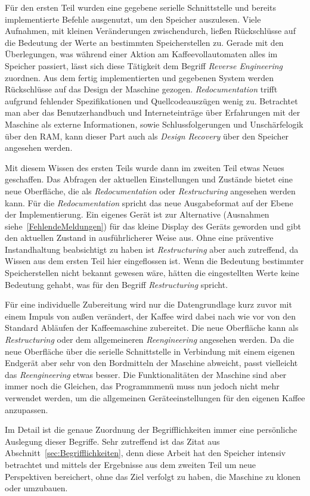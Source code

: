 Für den ersten Teil wurden eine gegebene serielle Schnittstelle und bereits implementierte Befehle ausgenutzt, um den Speicher auszulesen.
Viele Aufnahmen, mit kleinen Veränderungen zwischendurch, ließen Rückschlüsse auf die Bedeutung der Werte an bestimmten Speicherstellen zu.
Gerade mit den Überlegungen, was während einer Aktion am Kaffeevollautomaten alles im Speicher passiert, lässt sich diese Tätigkeit dem Begriff \textit{Reverse Engineering} zuordnen.
Aus dem fertig implementierten und gegebenen System werden Rückschlüsse auf das Design der Maschine gezogen.
\textit{Redocumentation} trifft aufgrund fehlender Spezifikationen und Quellcodeauszügen wenig zu.
Betrachtet man aber das Benutzerhandbuch und Interneteinträge über Erfahrungen mit der Maschine als externe Informationen, sowie Schlussfolgerungen und Unschärfelogik über den \ac{RAM}, kann dieser Part auch als \textit{Design Recovery} über den Speicher angesehen werden.

Mit diesem Wissen des ersten Teils wurde dann im zweiten Teil etwas Neues geschaffen.
Das Abfragen der aktuellen Einstellungen und Zustände bietet eine neue Oberfläche, die als \textit{Redocumentation} oder \textit{Restructuring} angesehen werden kann.
Für die \textit{Redocumentation} spricht das neue Ausgabeformat auf der Ebene der Implementierung.
Ein eigenes Gerät ist zur Alternative (Ausnahmen siehe~\ref{FehlendeMeldungen}) für das kleine Display des Geräts geworden und gibt den aktuellen Zustand in ausführlicherer Weise aus.
Ohne eine präventive Instandhaltung beabsichtigt zu haben ist \textit{Restructuring} aber auch zutreffend, da Wissen aus dem ersten Teil hier eingeflossen ist.
Wenn die Bedeutung bestimmter Speicherstellen nicht bekannt gewesen wäre, hätten die eingestellten Werte keine Bedeutung gehabt, was für den Begriff \textit{Restructuring} spricht.

Für eine individuelle Zubereitung wird nur die Datengrundlage kurz zuvor mit einem Impuls von außen verändert, der Kaffee wird dabei nach wie vor von den Standard Abläufen der Kaffeemaschine zubereitet.
Die neue Oberfläche kann als \textit{Restructuring} oder dem allgemeineren \textit{Reengineering} angesehen werden.
Da die neue Oberfläche über die serielle Schnittstelle in Verbindung mit einem eigenen Endgerät aber sehr von den Bordmitteln der Maschine abweicht, passt vielleicht das \textit{Reengineering} etwas besser.
Die Funktionalitäten der Maschine sind aber immer noch die Gleichen, das Programmmenü muss nun jedoch nicht mehr verwendet werden, um die allgemeinen Geräteeinstellungen für den eigenen Kaffee anzupassen.

Im Detail ist die genaue Zuordnung der Begrifflichkeiten immer eine persönliche Auslegung dieser Begriffe.
Sehr zutreffend ist das Zitat aus Abschnitt~\ref{sec:Begrifflichkeiten}, denn diese Arbeit hat den Speicher intensiv betrachtet und mittels der Ergebnisse aus dem zweiten Teil um neue Perspektiven bereichert, ohne das Ziel verfolgt zu haben, die Maschine zu klonen oder umzubauen.
